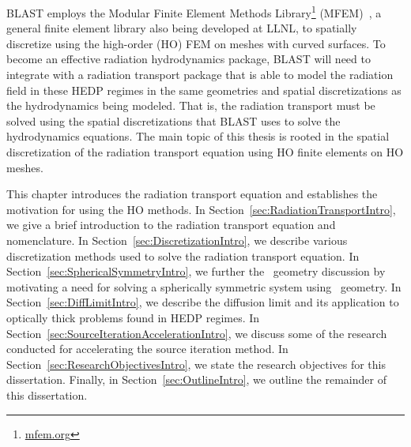 \documentclass[12pt,letterpaper]{article}
\begin{document}
BLAST employs the Modular Finite Element Methods Library\footnote{\url{mfem.org}} (MFEM)~\cite{MFEM_Web}, a general finite element library also being developed at LLNL, to spatially discretize using the high-order (HO) FEM on meshes with curved surfaces. To  become an effective radiation hydrodynamics package, BLAST will need to integrate with a radiation transport package that is able to model the radiation field in these HEDP regimes in the same geometries and spatial discretizations as the hydrodynamics being modeled. That is, the radiation transport must be solved using the spatial discretizations that BLAST uses to solve the hydrodynamics equations. The main topic of this thesis is rooted in the spatial discretization of the radiation transport equation using HO finite elements on HO meshes.

This chapter introduces the radiation transport equation and establishes the motivation for using the HO methods. In Section~\ref{sec:RadiationTransportIntro}, we give a brief introduction to the radiation transport equation and nomenclature. In Section~\ref{sec:DiscretizationIntro}, we describe various discretization methods used to solve the radiation transport equation.
In Section~\ref{sec:SphericalSymmetryIntro}, we further the \RZ\ geometry discussion by motivating a need for solving a spherically symmetric system using \RZ\ geometry. In Section~\ref{sec:DiffLimitIntro}, we describe the diffusion limit and its application to optically thick problems found in HEDP regimes.  In Section~\ref{sec:SourceIterationAccelerationIntro}, we discuss some of the research conducted for accelerating the source iteration method. In Section~\ref{sec:ResearchObjectivesIntro}, we state the research objectives for this dissertation. Finally, in Section~\ref{sec:OutlineIntro}, we outline the remainder of this dissertation.

\end{document}
